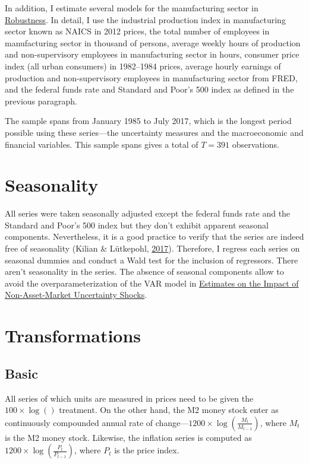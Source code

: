 \documentclass[12pt,twoside]{reedthesis}
\begin{document}
In addition, I estimate several models for the manufacturing sector in \protect\hyperlink{robustness}{Robustness}. In detail, I use the industrial production index in manufacturing sector known as NAICS in 2012 prices, the total number of employees in manufacturing sector in thousand of persons, average weekly hours of production and non-supervisory employees in manufacturing sector in hours, consumer price index (all urban consumers) in 1982--1984 prices, average hourly earnings of production and non-supervisory employees in manufacturing sector from FRED, and the federal funds rate and Standard and Poor's 500 index as defined in the previous paragraph.

The sample spans from January 1985 to July 2017, which is the longest period possible using these series---the uncertainty measures and the macroeconomic and financial variables. This sample spans gives a total of \(T = 391\) observations.

\hypertarget{seasonality}{%
\section{Seasonality}\label{seasonality}}

All series were taken seasonally adjusted except the federal funds rate and the Standard and Poor's 500 index but they don't exhibit apparent seasonal components. Nevertheless, it is a good practice to verify that the series are indeed free of seasonality (Kilian \& Lütkepohl, \protect\hyperlink{ref-kililutk:2017}{2017}). Therefore, I regress each series on seasonal dummies and conduct a Wald test for the inclusion of regressors. There aren't seasonality in the series. The absence of seasonal components allow to avoid the overparameterization of the VAR model in \protect\hyperlink{estimates-on-the-impact-of-non-asset-market-uncertainty-shocks}{Estimates on the Impact of Non-Asset-Market Uncertainty Shocks}.

\hypertarget{transformations}{%
\section{Transformations}\label{transformations}}

\hypertarget{basic}{%
\subsection{Basic}\label{basic}}

All series of which units are measured in prices need to be given the \(100 \times \log()\) treatment. On the other hand, the M2 money stock enter as continuously compounded annual rate of change---\(1200 \times \log (\frac{M_{t}}{M_{t - 1}})\), where \(M_{t}\) is the M2 money stock. Likewise, the inflation series is computed as \(1200 \times \log (\frac{P_{t}}{P_{t - 1}})\), where \(P_{t}\) is the price index.
\end{document}
